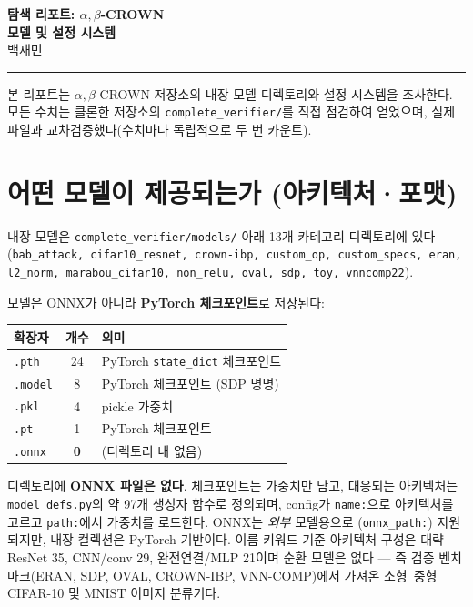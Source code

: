 \documentclass[10pt]{article}
\newcommand{\abc}{$\alpha,\beta$-CROWN}
\begin{document}
\begin{center}
  {\LARGE\bfseries 탐색 리포트: $\alpha,\beta$-CROWN\\[2pt]
   모델 및 설정 시스템}\\[10pt]
  {\normalsize 백재민}\\[2pt]
  \rule{\textwidth}{0.4pt}
\end{center}

\noindent
본 리포트는 \abc{} 저장소의 내장 모델 디렉토리와 설정 시스템을 조사한다. 모든 수치는
클론한 저장소의 \texttt{complete\_verifier/}를 직접 점검하여 얻었으며, 실제 파일과
교차검증했다(수치마다 독립적으로 두 번 카운트).

\section{어떤 모델이 제공되는가 (아키텍처·포맷)}
내장 모델은 \texttt{complete\_verifier/models/} 아래 13개 카테고리 디렉토리에 있다
(\texttt{bab\_attack, cifar10\_resnet, crown-ibp, custom\_op, custom\_specs, eran, l2\_norm,
marabou\_cifar10, non\_relu, oval, sdp, toy, vnncomp22}).

모델은 ONNX가 아니라 \textbf{PyTorch 체크포인트}로 저장된다:

\begin{table}[H]\centering\small
\begin{tabular}{lcl}
\toprule
확장자 & 개수 & 의미 \\
\midrule
\texttt{.pth}  & 24 & PyTorch \texttt{state\_dict} 체크포인트 \\
\texttt{.model}& 8  & PyTorch 체크포인트 (SDP 명명) \\
\texttt{.pkl}  & 4  & pickle 가중치 \\
\texttt{.pt}   & 1  & PyTorch 체크포인트 \\
\texttt{.onnx} & \textbf{0} & (디렉토리 내 없음) \\
\bottomrule
\end{tabular}
\end{table}

디렉토리에 \textbf{ONNX 파일은 없다}. 체크포인트는 가중치만 담고, 대응되는 아키텍처는
\texttt{model\_defs.py}의 약 97개 생성자 함수로 정의되며, config가 \texttt{name:}으로
아키텍처를 고르고 \texttt{path:}에서 가중치를 로드한다. ONNX는 \emph{외부} 모델용으로
(\texttt{onnx\_path:}) 지원되지만, 내장 컬렉션은 PyTorch 기반이다. 이름 키워드 기준 아키텍처
구성은 대략 ResNet 35, CNN/conv 29, 완전연결/MLP 21이며 순환 모델은 없다 --- 즉 검증
벤치마크(ERAN, SDP, OVAL, CROWN-IBP, VNN-COMP)에서 가져온 소형~중형 CIFAR-10 및 MNIST
이미지 분류기다.
\end{document}
